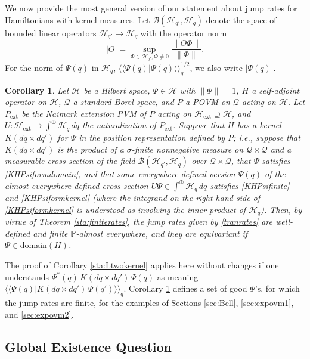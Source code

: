\documentclass[12pt]{article}
\newcommand{\1}{\mathbf{1}} %
\newcommand{\Hilbert}{\mathscr{H}}
\newcommand{\bdd}{\mathscr{B}} %
\newcommand{\scalar}[2]{\langle\!\langle #1 | #2 \rangle\!\rangle} %
\newcommand{\conf}{\mathcal{Q}} %
\newcommand{\measure}{\mathbb{P}} %
\newcommand{\pov}{{P}}%
\newcommand{\ext}{{\mathrm{ext}}} %
\newtheorem{corollary}{Corollary}
\begin{document}
We now provide the most general version of our statement about jump 
rates
for  Hamiltonians with kernel measures. Let $\bdd(\Hilbert_{q'},
\Hilbert_{q})$ denote the space of bounded linear operators 
$\Hilbert_{q'}
\to \Hilbert_{q}$ with the operator norm
\[
   |O| = \sup\limits_{\Phi \in\Hilbert_{q'},\Phi \neq 0}
    \frac{\|O\Phi\|}{\|\Phi\|}.
\]
For the norm of $\Psi(q)$ in $\Hilbert_q$,
$\scalar{\Psi(q)}{\Psi(q)}_q^{1/2}$, we also write $|\Psi(q)|$.

\begin{corollary}\label{sta:povkernel}
   Let $\Hilbert$ be a Hilbert space, $\Psi \in \Hilbert$ with
   $\|\Psi\| =1$, $H$ a self-adjoint operator on $\Hilbert$, $\conf$ a
   standard Borel space, and $\pov$ a POVM on $\conf$ acting on
   $\Hilbert$. Let $\pov_\ext$ be the Naimark extension PVM of $\pov$
   acting on $\Hilbert_\ext \supseteq \Hilbert$, and $U: \Hilbert_\ext
   \to \int^\oplus\Hilbert_q \, dq$ the naturalization of
   $\pov_\ext$. Suppose that $H$ has a kernel $K(dq \times dq')$ for
   $\Psi$ in the position representation defined by $\pov$; i.e.,
   suppose that $K(dq \times dq')$ is the product of a $\sigma$-finite
   nonnegative measure on $\conf \times \conf$ and a measurable
   cross-section of the field $\bdd(\Hilbert_{q'},\Hilbert_{q})$ over
   $\conf \times \conf$, that $\Psi$ satisfies \eqref{KHPsiformdomain},
   and that some everywhere-defined version $\Psi(q)$ of the
   almost-everywhere-defined cross-section $U\Psi \in \int^\oplus
   \Hilbert_q \, dq$ satisfies \eqref{KHPsifinite} and
   \eqref{KHPsiformkernel} (where the integrand on the right hand side
   of \eqref{KHPsiformkernel} is understood as involving the inner
   product of $\Hilbert_q$).  Then, by virtue of Theorem
   \ref{sta:finiterates}, the jump rates given by \eqref{tranrates} are
   well-defined and finite $\measure$-almost everywhere, and they are
   equivariant if $\Psi \in \mathrm{domain}(H)$.
\end{corollary}

The proof of Corollary \ref{sta:Ltwokernel} applies here without
changes if one understands $\Psi^*(q) \, K(dq \times dq') \, \Psi(q)$
as meaning $\scalar{\Psi(q)}{K(dq \times dq') \, \Psi(q')}_q$.
Corollary \ref{sta:povkernel} defines a set  of good $\Psi$'s, for
which the jump rates are finite,  for the examples of Sections
\ref{sec:Bell}, \ref{sec:expovm1}, and \ref{sec:expovm2}.


\subsection{Global Existence Question}
\end{document}
